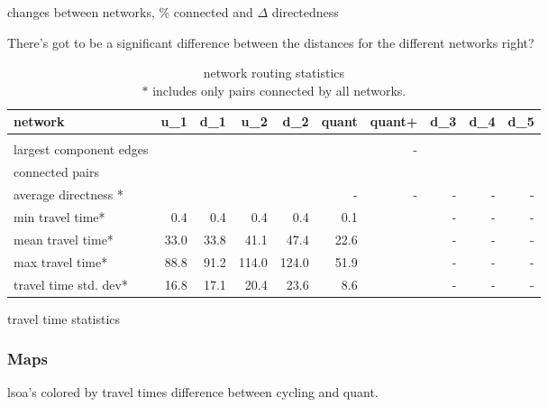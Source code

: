 \begin{table}
\centering
\caption{changes between networks, \% connected and $\Delta$ directedness}
\label{table:change between nets}
\end{table}

There's got to be a significant difference between the distances for the different networks right?


\begin{table}[]
\begin{tabular}{lrrrrrrrrr}
network                      & u\_1 & d\_1 & u\_2  & d\_2  & quant & quant+ & d\_3 & d\_4 & d\_5 \\ \hline
                             &      &      &       &       &       &        &      &      &      \\
largest component edges      &      &      &       &       &       & -      &      &      &      \\
connected pairs              &      &      &       &       &       &        &      &      &      \\
average directness *         &      &      &       &       & -     & -      & -    & -    & -    \\
min travel time*      & 0.4  & 0.4  & 0.4   & 0.4   & 0.1   &        & -    & -    & -    \\
mean travel time*     & 33.0 & 33.8 & 41.1  & 47.4  & 22.6  &        & -    & -    & -    \\
max travel time*      & 88.8 & 91.2 & 114.0 & 124.0 & 51.9  &        & -    & -    & -    \\
travel time std. dev* & 16.8 & 17.1 & 20.4  & 23.6  & 8.6   &        & -    & -    & -   
\end{tabular}
\caption[caption]{network routing statistics \\ $*$ includes only pairs connected by all networks.}
\label{table:travel_time_stats}
\end{table}

\begin{table}
\centering
\caption{travel time statistics}
\label{table:travel_time_stats}
\end{table}


\subsubsection{Maps}

lsoa's colored by travel times difference between cycling and quant. 



